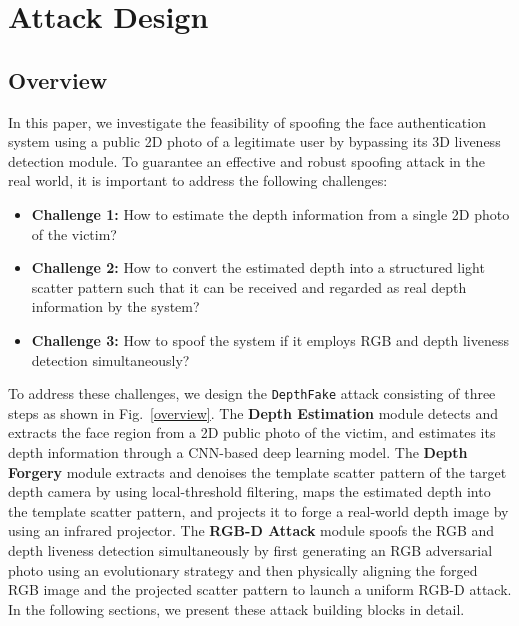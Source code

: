 \section{Attack Design}

\subsection{Overview}
 In this paper, we investigate the feasibility of spoofing the face authentication system using a public 2D photo of a legitimate user by bypassing its 3D liveness detection module. 
 To guarantee an effective and robust spoofing attack in the real world, it is important to address the following  challenges:

\begin{itemize}
	\item \textbf{Challenge 1:} 
	How to estimate the depth information from a single 2D photo of the victim?
	\item \textbf{Challenge 2:} 
	How to convert the estimated depth into a structured light scatter pattern such that it can be received and regarded as real depth information by the system?
	\item \textbf{Challenge 3:} 
	How to spoof the system if it employs RGB and depth liveness detection simultaneously?

\end{itemize}

To address these challenges, we design the \texttt{DepthFake} attack consisting of three steps as shown in Fig.~\ref{overview}. 
The \textbf{Depth Estimation} module detects and extracts the face region from a 2D public photo of the victim, and estimates its depth information through a CNN-based deep learning model. 
The \textbf{Depth Forgery} module extracts and denoises the template scatter pattern of the target depth camera by using local-threshold filtering, maps the estimated depth  into the template scatter pattern, and projects it to forge a real-world depth image by using an infrared projector. 
The \textbf{RGB-D Attack} module spoofs the RGB and depth liveness detection 
simultaneously by first generating an RGB adversarial photo using an evolutionary strategy and then physically aligning the forged RGB image and the projected scatter pattern to launch a uniform RGB-D attack.
In the following sections, we present these attack building blocks in detail.

